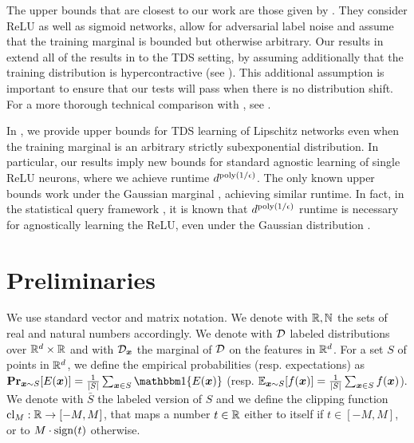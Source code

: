 \documentclass[11pt]{article} %
\numberwithin{equation}{section}
\begin{document}
The upper bounds that are closest to our work are those given by \cite{reliable_goel2017}. They consider ReLU as well as sigmoid networks, allow for adversarial label noise and assume that the training marginal is bounded but otherwise arbitrary. Our results in  extend all of the results in \cite{reliable_goel2017} to the TDS setting, by assuming additionally that the training distribution is hypercontractive (see ). This additional assumption is important to ensure that our tests will pass when there is no distribution shift. For a more thorough technical comparison with \cite{reliable_goel2017}, see .

In , we provide upper bounds for TDS learning of Lipschitz networks even when the training marginal is an arbitrary strictly subexponential distribution. In particular, our results imply new bounds for standard agnostic learning of single ReLU neurons, where we achieve runtime $d^{\mathrm{poly}({1/{\epsilon}})}$. The only known upper bounds work under the Gaussian marginal \cite{diakonikolas2020approximation}, achieving similar runtime. In fact, in the statistical query  framework \cite{kearns1998efficient}, it is known that $d^{\mathrm{poly}(1/{\epsilon})}$ runtime is necessary for agnostically learning the ReLU, even under the Gaussian distribution \cite{diakonikolas2020near,goel2020statistical}. 



\section{Preliminaries}

We use standard vector and matrix notation. We denote with $\mathbb{R}, {\mathbb{N}}$ the sets of real and natural numbers accordingly. We denote with ${\mathcal{D}}$ labeled distributions over $\mathbb{R}^d\times \mathbb{R}$ and with ${\mathcal{D}}_{\bm{x}}$ the marginal of ${\mathcal{D}}$ on the features in $\mathbb{R}^d$. For a set $S$ of points in $\mathbb{R}^d$, we define the empirical probabilities (resp. expectations) as $\Pr_{\x\sim S}[E(\x)] = \frac{1}{|S|}\sum_{\x\in S} \ind\{E(\x)\}$ (resp. $\mathbb{E}_{{\bm{x}}\sim S}[f({\bm{x}})] = \frac{1}{|S|}\sum_{{\bm{x}}\in S}f({\bm{x}})$). We denote with $\bar{S}$ the labeled version of $S$ and we define the clipping function $\mathrm{cl}_M:\mathbb{R}\to [-M,M]$, that maps a number $t\in\mathbb{R}$ either to itself if $t\in[-M,M]$, or to $M\cdot\operatorname{sign}(t)$ otherwise.
\end{document}
